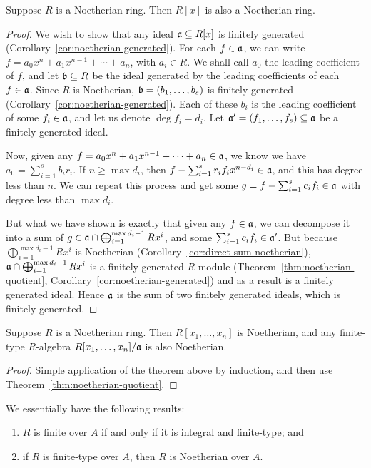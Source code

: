 \begin{theorem}\label{thm:hilbert-basis}
    Suppose \(R\) is a Noetherian ring.
    Then \(R[x]\) is also a Noetherian ring.
\end{theorem}
\begin{proof}
    We wish to show that any ideal \(\mathfrak{a} \subseteq R[x]\) is finitely generated (Corollary~\ref{cor:noetherian-generated}).
    For each \(f \in \mathfrak{a}\), we can write \(f = a_0x^n + a_1x^{n-1} + \cdots + a_n\), with \(a_i \in R\).
    We shall call \(a_0\) the leading coefficient of \(f\),
    and let \(\mathfrak{b} \subseteq R\) be the ideal generated by the leading coefficients of each \(f \in \mathfrak{a}\).
    Since \(R\) is Noetherian, \(\mathfrak{b} = (b_1,\hdots,b_s)\) is finitely generated (Corollary~\ref{cor:noetherian-generated}).
    Each of these \(b_i\) is the leading coefficient of some \(f_i \in \mathfrak{a}\),
    and let us denote \(\deg f_i = d_i\).
    Let \(\mathfrak{a}' = (f_1,\hdots,f_s) \subseteq \mathfrak{a}\) be a finitely generated ideal.

    Now, given any \(f = a_0x^n + a_1x^{n-1} + \cdots + a_n \in \mathfrak{a}\),
    we know we have \(a_0 = \sum_{i=1}^s b_i r_i\).
    If \(n \geq \max d_i\), then \(f - \sum_{i=1}^s r_i f_i x^{n-d_i} \in \mathfrak{a}\),
    and this has degree less than \(n\).
    We can repeat this process and get some \(g = f - \sum_{i=1}^s c_i f_i \in \mathfrak{a}\)
    with degree less than \(\max d_i\).

    But what we have shown is exactly that given any \(f \in \mathfrak{a}\),
    we can decompose it into a sum of \(g \in \mathfrak{a} \cap \bigoplus_{i=1}^{\max d_i - 1} Rx^i\),
    and some \(\sum_{i=1}^s c_i f_i \in \mathfrak{a}'\).
    But because \(\bigoplus_{i=1}^{\max d_i - 1} Rx^i\) is Noetherian (Corollary~\ref{cor:direct-sum-noetherian}),
    \(\mathfrak{a} \cap \bigoplus_{i=1}^{\max d_i - 1} Rx^i\) is a finitely generated \(R\)-module (Theorem~\ref{thm:noetherian-quotient}, Corollary~\ref{cor:noetherian-generated})
    and as a result is a finitely generated ideal.
    Hence \(\mathfrak{a}\) is the sum of two finitely generated ideals, which is finitely generated.
\end{proof}
\begin{corollary}\label{cor:hilbert-basis}
    Suppose \(R\) is a Noetherian ring.
    Then \(R[x_1,\hdots,x_n]\) is Noetherian,
    and any finite-type \(R\)-algebra \(R[x_1,\hdots,x_n]/\mathfrak{a}\) is also Noetherian.
\end{corollary}
\begin{proof}
    Simple application of the \hyperref[thm:hilbert-basis]{theorem above} by induction,
    and then use Theorem~\ref{thm:noetherian-quotient}.
\end{proof}
\begin{remark}
    We essentially have the following results:
    \begin{enumerate}[label={(\alph*)}, itemsep=0mm]
        \item \(R\) is finite over \(A\) if and only if it is integral and finite-type; and
        \item if \(R\) is finite-type over \(A\), then \(R\) is Noetherian over \(A\).
    \end{enumerate}
\end{remark}

